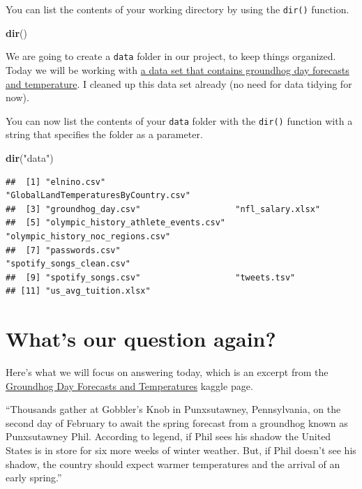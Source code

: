 \documentclass[
]{book}
\newenvironment{Shaded}{\begin{snugshade}}{\end{snugshade}}
\newcommand{\KeywordTok}[1]{\textcolor[rgb]{0.13,0.29,0.53}{\textbf{#1}}}
\newcommand{\NormalTok}[1]{#1}
\newcommand{\StringTok}[1]{\textcolor[rgb]{0.31,0.60,0.02}{#1}}
\begin{document}
You can list the contents of your working directory by using the \texttt{dir()} function.

\begin{Shaded}
\begin{Highlighting}[]
\KeywordTok{dir}\NormalTok{()}
\end{Highlighting}
\end{Shaded}

We are going to create a \texttt{data} folder in our project, to keep things organized. Today we will be working with \href{https://www.kaggle.com/groundhogclub/groundhog-day}{a data set that contains groundhog day forecasts and temperature}. I cleaned up this data set already (no need for data tidying for now).

You can now list the contents of your \texttt{data} folder with the \texttt{dir()} function with a string that specifies the folder as a parameter.

\begin{Shaded}
\begin{Highlighting}[]
\KeywordTok{dir}\NormalTok{(}\StringTok{"data"}\NormalTok{)}
\end{Highlighting}
\end{Shaded}

\begin{verbatim}
##  [1] "elnino.csv"                          "GlobalLandTemperaturesByCountry.csv"
##  [3] "groundhog_day.csv"                   "nfl_salary.xlsx"                    
##  [5] "olympic_history_athlete_events.csv"  "olympic_history_noc_regions.csv"    
##  [7] "passwords.csv"                       "spotify_songs_clean.csv"            
##  [9] "spotify_songs.csv"                   "tweets.tsv"                         
## [11] "us_avg_tuition.xlsx"
\end{verbatim}

\hypertarget{whats-our-question-again}{%
\section{What's our question again?}\label{whats-our-question-again}}

Here's what we will focus on answering today, which is an excerpt from the \href{https://www.kaggle.com/groundhogclub/groundhog-day}{Groundhog Day Forecasts and Temperatures} kaggle page.

``Thousands gather at Gobbler's Knob in Punxsutawney, Pennsylvania, on the second day of February to await the spring forecast from a groundhog known as Punxsutawney Phil. According to legend, if Phil sees his shadow the United States is in store for six more weeks of winter weather. But, if Phil doesn't see his shadow, the country should expect warmer temperatures and the arrival of an early spring.''
\end{document}
